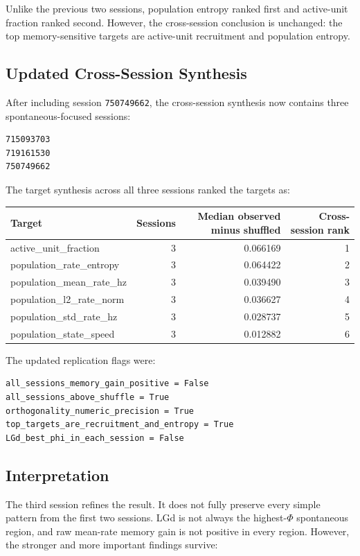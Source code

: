 Unlike the previous two sessions, population entropy ranked first and active-unit fraction ranked second. However, the cross-session conclusion is unchanged: the top memory-sensitive targets are active-unit recruitment and population entropy.

\subsection{Updated Cross-Session Synthesis}

After including session \texttt{750749662}, the cross-session synthesis now contains three spontaneous-focused sessions:

\begin{verbatim}
715093703
719161530
750749662
\end{verbatim}

The target synthesis across all three sessions ranked the targets as:

\begin{center}
\begin{tabular}{lrrr}
\hline
Target & Sessions & Median observed minus shuffled & Cross-session rank \\
\hline
active\_unit\_fraction & 3 & 0.066169 & 1 \\
population\_rate\_entropy & 3 & 0.064422 & 2 \\
population\_mean\_rate\_hz & 3 & 0.039490 & 3 \\
population\_l2\_rate\_norm & 3 & 0.036627 & 4 \\
population\_std\_rate\_hz & 3 & 0.028737 & 5 \\
population\_state\_speed & 3 & 0.012882 & 6 \\
\hline
\end{tabular}
\end{center}

The updated replication flags were:

\begin{verbatim}
all_sessions_memory_gain_positive = False
all_sessions_above_shuffle = True
orthogonality_numeric_precision = True
top_targets_are_recruitment_and_entropy = True
LGd_best_phi_in_each_session = False
\end{verbatim}

\subsection{Interpretation}

The third session refines the result. It does not fully preserve every simple pattern from the first two sessions. LGd is not always the highest-\(\Phi\) spontaneous region, and raw mean-rate memory gain is not positive in every region. However, the stronger and more important findings survive:

